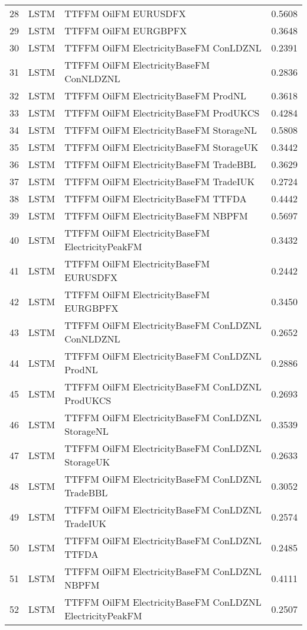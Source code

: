 \begin{table}[ht]
\begin{tabular}{rllr}
  28 & LSTM & TTFFM OilFM EURUSDFX & 0.5608 \\ 
  29 & LSTM & TTFFM OilFM EURGBPFX & 0.3648 \\ 
  30 & LSTM & TTFFM OilFM ElectricityBaseFM ConLDZNL & 0.2391 \\ 
  31 & LSTM & TTFFM OilFM ElectricityBaseFM ConNLDZNL & 0.2836 \\ 
  32 & LSTM & TTFFM OilFM ElectricityBaseFM ProdNL & 0.3618 \\ 
  33 & LSTM & TTFFM OilFM ElectricityBaseFM ProdUKCS & 0.4284 \\ 
  34 & LSTM & TTFFM OilFM ElectricityBaseFM StorageNL & 0.5808 \\ 
  35 & LSTM & TTFFM OilFM ElectricityBaseFM StorageUK & 0.3442 \\ 
  36 & LSTM & TTFFM OilFM ElectricityBaseFM TradeBBL & 0.3629 \\ 
  37 & LSTM & TTFFM OilFM ElectricityBaseFM TradeIUK & 0.2724 \\ 
  38 & LSTM & TTFFM OilFM ElectricityBaseFM TTFDA & 0.4442 \\ 
  39 & LSTM & TTFFM OilFM ElectricityBaseFM NBPFM & 0.5697 \\ 
  40 & LSTM & TTFFM OilFM ElectricityBaseFM ElectricityPeakFM & 0.3432 \\ 
  41 & LSTM & TTFFM OilFM ElectricityBaseFM EURUSDFX & 0.2442 \\ 
  42 & LSTM & TTFFM OilFM ElectricityBaseFM EURGBPFX & 0.3450 \\ 
  43 & LSTM & TTFFM OilFM ElectricityBaseFM ConLDZNL ConNLDZNL & 0.2652 \\ 
  44 & LSTM & TTFFM OilFM ElectricityBaseFM ConLDZNL ProdNL & 0.2886 \\ 
  45 & LSTM & TTFFM OilFM ElectricityBaseFM ConLDZNL ProdUKCS & 0.2693 \\ 
  46 & LSTM & TTFFM OilFM ElectricityBaseFM ConLDZNL StorageNL & 0.3539 \\ 
  47 & LSTM & TTFFM OilFM ElectricityBaseFM ConLDZNL StorageUK & 0.2633 \\ 
  48 & LSTM & TTFFM OilFM ElectricityBaseFM ConLDZNL TradeBBL & 0.3052 \\ 
  49 & LSTM & TTFFM OilFM ElectricityBaseFM ConLDZNL TradeIUK & 0.2574 \\ 
  50 & LSTM & TTFFM OilFM ElectricityBaseFM ConLDZNL TTFDA & 0.2485 \\ 
  51 & LSTM & TTFFM OilFM ElectricityBaseFM ConLDZNL NBPFM & 0.4111 \\ 
  52 & LSTM & TTFFM OilFM ElectricityBaseFM ConLDZNL ElectricityPeakFM & 0.2507 \\ 

\end{tabular}
\end{table}
